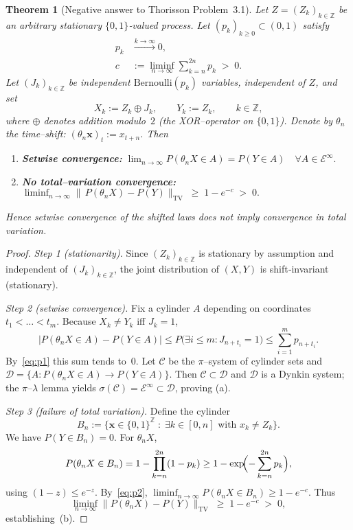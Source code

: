 \documentclass[11pt]{article}
\newtheorem{theorem}{Theorem}
\begin{document}
\begin{theorem}[Negative answer to Thorisson Problem~3.1]
Let $Z=(Z_k)_{k\in\mathbb Z}$ be an \emph{arbitrary} stationary $\{0,1\}$‑valued process.
Let $(p_k)_{k\ge0}\subset(0,1)$ satisfy
\begin{subequations}\label{eq:pconds}
\begin{align}
  p_k &\xrightarrow{k\to\infty} 0, \label{eq:p1}\\
  c  &:= \liminf_{n\to\infty}\sum_{k=n}^{2n}p_k \;>\;0. \label{eq:p2}
\end{align}
\end{subequations}
Let $(J_k)_{k\in\mathbb Z}$ be independent $\mathrm{Bernoulli}(p_k)$ variables, independent of $Z$, and set
\[
  X_k := Z_k \oplus J_k,\qquad
  Y_k := Z_k,\qquad k\in\mathbb Z,
\]
where $\oplus$ denotes addition modulo~$2$ (the XOR–operator on $\{0,1\}$).
Denote by $\theta_n$ the time–shift: $(\theta_n\bm x)_t := x_{t+n}$.
Then
\begin{enumerate}[label=\textup{(\alph*)}]
  \item \textbf{Setwise convergence:}
        \(
          \displaystyle
          \lim_{n\to\infty} P(\theta_n X\in A)=P(Y\in A)
          \quad\forall A\in\mathcal E^{\infty}.
        \)
  \item \textbf{No total–variation convergence:}
        \(
          \displaystyle
          \liminf_{n\to\infty}
          \bigl\|\,P(\theta_n X)-P(Y)\bigr\|_{\mathrm{TV}}
          \;\ge\;1-e^{-c}\;>\;0.
        \)
\end{enumerate}
Hence setwise convergence of the shifted laws does not imply convergence in total variation.
\end{theorem}

\begin{proof}
\textit{Step 1 (stationarity).}
Since $(Z_k)_{k\in\mathbb Z}$ is stationary by assumption and independent of $(J_k)_{k\in\mathbb Z}$, the joint distribution of $(X,Y)$ is shift‑invariant (stationary).

\smallskip
\textit{Step 2 (setwise convergence).}
Fix a cylinder $A$ depending on coordinates $t_1<\dots<t_m$.
Because $X_k\neq Y_k$ iff $J_k=1$,
\[
  \bigl|P(\theta_n X\in A)-P(Y\in A)\bigr|
  \le P\!\bigl(\exists i\le m: J_{n+t_i}=1\bigr)
  \le \sum_{i=1}^{m} p_{n+t_i}.
\]
By~\eqref{eq:p1} this sum tends to~$0$.
Let $\mathcal C$ be the $\pi$–system of cylinder sets and
$\mathcal D=\{A: P(\theta_n X\in A)\to P(Y\in A)\}$.
Then $\mathcal C\subset\mathcal D$ and $\mathcal D$ is a Dynkin system;
 the $\pi$–$\lambda$ lemma yields $\sigma(\mathcal C)=\mathcal E^\infty\subset\mathcal D$,
proving (a).

\smallskip
\textit{Step 3 (failure of total variation).}
Define the cylinder
\[
  B_n := \bigl\{\bm x\in\{0,1\}^{\mathbb Z}\;:\;
           \exists k\in[0,n]\text{ with }x_k\neq Z_k \bigr\}.
\]
We have $P(Y\in B_n)=0$.  For $\theta_n X$,
\[
  P(\theta_n X\in B_n)
     = 1-\prod_{k=n}^{2n}(1-p_k)
     \ge 1-\exp\!\Bigl(-\sum_{k=n}^{2n} p_k\Bigr),
\]
using $(1-z)\le e^{-z}$.
By~\eqref{eq:p2}, $\liminf_{n\to\infty}P(\theta_n X\in B_n)\ge 1-e^{-c}$.
Thus
\[
  \liminf_{n\to\infty}\bigl\|P(\theta_n X)-P(Y)\bigr\|_{\mathrm{TV}}
  \;\ge\;1-e^{-c}\;>\;0,
\]
establishing~(b).
\end{proof}
\end{document}
